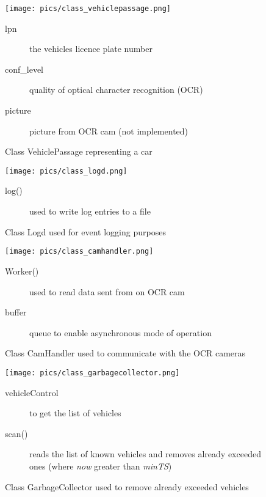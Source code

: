 \documentclass[oneside,bachelor,etd]{BYUPhys}
\begin{document}
\begin{figure}[p]
    \centerline{\texttt{[image: pics/class\_vehiclepassage.png]}}
    \caption[Class VehiclePassage]{\label{fig:Class VehiclePassage}
	Class VehiclePassage representing a car}

	\begin{description}
	\item[lpn] the vehicles licence plate number
	\item[conf\_level] quality of optical character recognition (OCR)
	\item[picture] picture from OCR cam (not implemented)
	\end{description}
\end{figure}

\begin{figure}[p]
    \centerline{\texttt{[image: pics/class\_logd.png]}}
    \caption[Class Logd]{\label{fig:Class Logd}
	Class Logd used for event logging purposes}
	
	\begin{description}
	\item[log()] used to write log entries to a file
	\end{description}
\end{figure}

\begin{figure}[p]
    \centerline{\texttt{[image: pics/class\_camhandler.png]}}
    \caption[Class CamHandler]{\label{fig:Class CamHandler}
	Class CamHandler used to communicate with the OCR cameras}
	
	\begin{description}
	\item[Worker()] used to read data sent from on OCR cam
	\item[buffer] queue to enable asynchronous mode of operation
	\end{description}
\end{figure}

\begin{figure}[p]
    \centerline{\texttt{[image: pics/class\_garbagecollector.png]}}
    \caption[Class GarbageCollector]{\label{fig:Class GarbageCollector}
	Class GarbageCollector used to remove already exceeded vehicles}
	
	\begin{description}
	\item[vehicleControl] to get the list of vehicles
	\item[scan()] reads the list of known vehicles and removes already exceeded ones
	(where \textit{now} greater than \textit{minTS})
	\end{description}
\end{figure}
\end{document}
